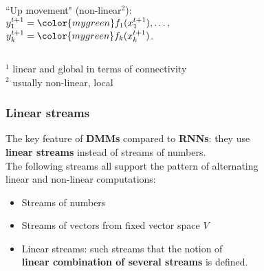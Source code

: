 \documentclass{beamer}
\newcommand{\msblue}[1]{{\color{myblue} #1}}
\newcommand{\msmagenta}[1]{{\color{mymagenta} #1}}
\newcommand{\msgreen}[1]{{\color{mygreen} #1}}
\begin{document}
\begin{frame}
\begin{columns}[T]
\begin{column}{0.5\textwidth}
``Up movement" \msgreen{(non-linear$^2$)}:\\[2ex]  

$y_1^{t+1} = \msgreen{f_1}(x_1^{t+1}), \ldots,$\\[0.1ex]$y_k^{t+1} = \msgreen{f_k}(x_k^{t+1})$.

\end{column}
\end{columns}

\hrulefill

\msblue{\footnotesize $^1$ linear and global in terms of connectivity}\\
\msgreen{\footnotesize $^2$ usually non-linear, local}

\end{frame}


\begin{frame}

\frametitle{\msmagenta{Linear streams}}

The key feature of {\bf DMMs} compared to {\bf RNNs}:
         they use\\ {\bf linear streams} instead of streams of numbers.\\[2ex]

The following streams all support the pattern of alternating\\ linear and non-linear computations:\\[2ex]

\begin{itemize}

\item Streams of numbers\\[2ex]

\item Streams of vectors from fixed vector space $V$\\[2ex]

\item Linear streams: such streams that the notion of\\ {\bf linear combination of several streams} is defined.\\[3ex]

\end{itemize}






\end{frame}
\end{document}
